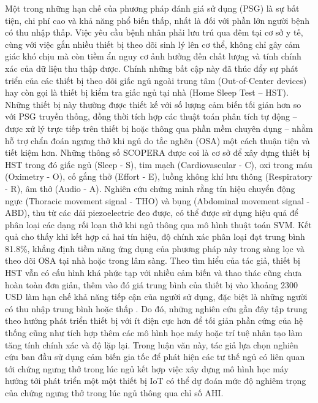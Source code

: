 Một trong những hạn chế của phương pháp đánh giá sử dụng (\gls{PSG}) là sự bất tiện, chi phí cao và khả năng phổ biến thấp, nhất là đối với phần lớn người bệnh có thu nhập thấp. Việc yêu cầu bệnh nhân phải lưu trú qua đêm tại cơ sở y tế, cùng với việc gắn nhiều thiết bị theo dõi sinh lý lên cơ thể, không chỉ gây cảm giác khó chịu mà còn tiềm ẩn nguy cơ ảnh hưởng đến chất lượng và tính chính xác của dữ liệu thu thập được. Chính những bất cập này đã thúc đẩy sự phát triển của các thiết bị theo dõi giấc ngủ ngoài trung tâm (Out-of-Center devices) hay còn gọi là thiết bị kiểm tra giấc ngủ tại nhà (Home Sleep Test – HST). Những thiết bị này thường được thiết kế với số lượng cảm biến tối giản hơn so với PSG truyền thống, đồng thời tích hợp các thuật toán phân tích tự động – được xử lý trực tiếp trên thiết bị hoặc thông qua phần mềm chuyên dụng – nhằm hỗ trợ chẩn đoán ngưng thở khi ngủ do tắc nghẽn (OSA) một cách thuận tiện và tiết kiệm hơn. Những thông số SCOPERA được coi là cơ sở để xây dựng thiết bị HST trong đó giấc ngủ (Sleep - S), tim mạch (Cardiovascular - C), oxi trong máu (Oximetry - O), cố gắng thở (Effort - E), luồng không khí lưu thông (Respiratory - R), âm thở (Audio - A). Nghiên cứu\cite{svmHSt2017} chứng minh rằng tín hiệu chuyển động ngực (Thoracic movement signal - THO) và bụng (Abdominal movement signal - ABD), thu từ các dải piezoelectric đeo được, có thể được sử dụng hiệu quả để phân loại các dạng rối loạn thở khi ngủ thông qua mô hình thuật toán SVM. Kết quả cho thấy khi kết hợp cả hai tín hiệu, độ chính xác phân loại đạt trung bình 81.8\%, khẳng định tiềm năng ứng dụng của phương pháp này trong sàng lọc và theo dõi OSA tại nhà hoặc trong lâm sàng.
Theo tìm hiểu của tác giả, thiết bị HST vẫn có cấu hình khá phức tạp với nhiều cảm biến và thao thác cũng chưa hoàn toàn đơn giản, thêm vào đó giá trung bình của thiết bị vào khoảng 2300 USD làm hạn chế khả năng tiếp cận của người sử dụng, đặc biệt là những người có thu nhập trung bình hoặc thấp \cite{hst_review}. Do đó, những nghiên cứu gần đây tập trung theo hướng phát triển thiết bị với ít điện cực hơn để tối giản phần cứng của hệ thống cũng như tích hợp thêm các mô hình học máy hoặc trí tuệ nhân tạo làm tăng tính chính xác và độ lặp lại. Trong luận văn này, tác giả lựa chọn nghiên cứu ban đầu sử dụng cảm biến gia tốc để phát hiện các tư thế ngủ có liên quan tới chứng ngưng thở trong lúc ngủ kết hợp việc xây dựng mô hình học máy hướng tới phát triển một một thiết bị IoT có thể dự đoán mức độ nghiêm trọng của chứng ngưng thở trong lúc ngủ thông qua chỉ số AHI.

